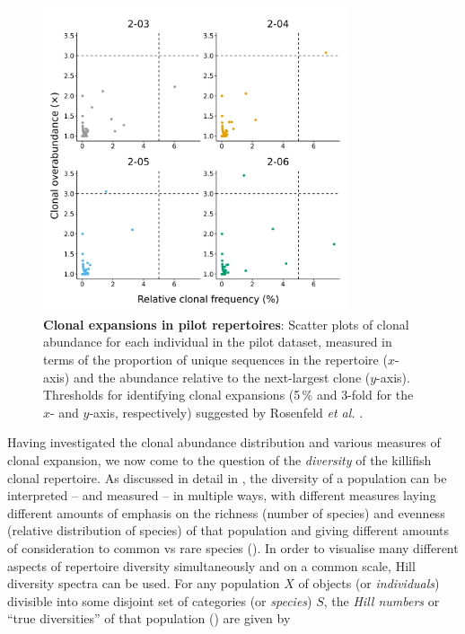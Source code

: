 \begin{figure}
\centering
\includegraphics[width=0.8\textwidth]{_Figures/png/pilot-clones-expansions}
\caption[Clonal expansions in \Nfu pilot repertoires]{\textbf{Clonal expansions in \Nfu pilot repertoires}: Scatter plots of clonal abundance for each individual in the pilot \igseq dataset, measured in terms of the proportion of unique sequences in the repertoire ($x$-axis) and the abundance relative to the next-largest clone ($y$-axis). Thresholds for identifying clonal expansions (5\,\% and 3-fold for the $x$- and $y$-axis, respectively) suggested by Rosenfeld \textit{et al.} \parencite{rosenfeld2018clonesize}.}
\label{fig:igseq-pilot-clones-expansions}
\end{figure}

Having investigated the clonal abundance distribution and various measures of clonal expansion, we now come to the question of the \textit{diversity} of the killifish clonal repertoire. As discussed in detail in , the diversity of a population can be interpreted -- and measured -- in multiple ways, with different measures laying different amounts of emphasis on the richness (number of species) and evenness (relative distribution of species) of that population and giving different amounts of consideration to common vs rare species (). In order to visualise many different aspects of repertoire diversity simultaneously and on a common scale, Hill diversity spectra \parencite{hill1973diversity} can be used. For any population $X$ of objects (or \textit{individuals}) divisible into some disjoint set of categories (or \textit{species}) $S$, the \textit{Hill numbers} or ``true diversities'' of that population () \parencite{hill1973diversity, jost2006entropy} are given by

